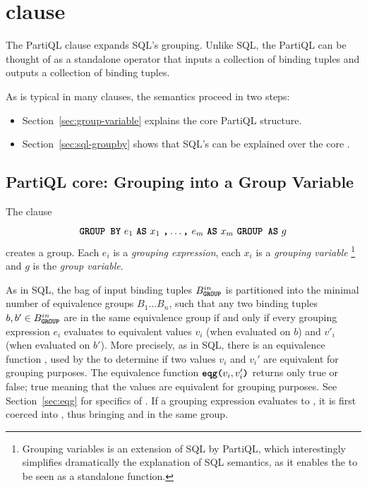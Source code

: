 \section{ clause}
\label{section:group-by} 
The PartiQL  clause expands SQL's grouping. Unlike SQL, the PartiQL
 can be thought of as a standalone operator that inputs a
collection of binding tuples and outputs a collection of binding tuples. 

As is typical in many clauses, the semantics proceed in two steps:
\begin{itemize}
\item Section~\ref{sec:group-variable} explains the core PartiQL 
structure.
\item Section~\ref{sec:sql-groupby} shows that SQL's  can be
explained over the core .
\end{itemize}

\subsection{PartiQL  core: Grouping into a Group Variable}
The  clause  
\label{sec:group-variable}

%
\[ \texttt{\textbf{GROUP BY}}\ e_1\ \texttt{\textbf{AS}}\ x_1\ \texttt{\textbf{,}} \ldots \texttt{\textbf{,}}\ e_m\ \texttt{\textbf{AS}}\ x_m\ \texttt{\textbf{GROUP AS}}\ g\] 
%
\noindent creates a group. Each $e_i$ is a \textit{grouping expression}, each
$x_i$ is a \textit{grouping variable}
\footnote{Grouping variables is an extension of SQL by PartiQL, which
interestingly simplifies dramatically the explanation of SQL semantics, as it
enables the  to be seen as a standalone function.}
and $g$ is the \textit{group variable}. 


As in SQL, the bag of input binding tuples $B^{in}_{\texttt{\textbf{GROUP}}}$ is partitioned
into the minimal number of equivalence groups $B_1 \ldots B_n$, such that any
two binding tuples $b, b' \in B^{in}_{\texttt{\textbf{GROUP}}}$ are in the same equivalence
group if and only if every grouping expression $e_i$ evaluates to equivalent
values $v_i$ (when evaluated on $b$) and $v'_i$ (when evaluated on $b'$). More
precisely, as in SQL, there is an equivalence function , used by the
 to determine if two values $v_i$ and $v_i'$ are equivalent for
grouping purposes. The equivalence function $\texttt{\textbf{eqg(}}v_i, v'_i\texttt{\textbf{)}}$ returns
only true or false; true meaning that the values are equivalent for grouping
purposes. See Section~\ref{sec:eqg} for specifics of . If a grouping
expression evaluates to \MISSING, it is first coerced into \NULL,
thus bringing \MISSING and \NULL in the same group.

